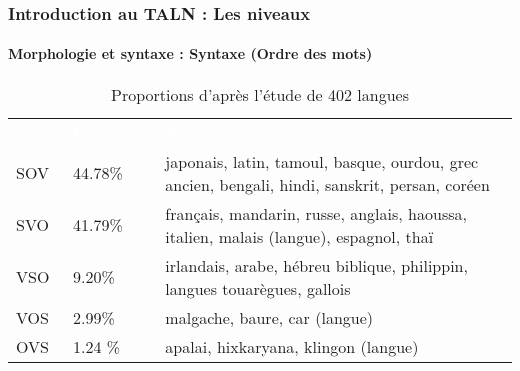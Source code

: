 \documentclass[xcolor=table]{beamer}
\begin{document}
\begin{frame}
\frametitle{Introduction au TALN : Les niveaux}
\framesubtitle{Morphologie et syntaxe : Syntaxe (Ordre des mots)}

\begin{table}
	\begin{tabular}{p{}p{}p{}}
		\rowcolor{darkblue}
		\textcolor{white}{Ordre} & \textcolor{white}{Proportion} & \textcolor{white}{Exemples} \\
		SOV & 44.78\% & japonais, latin, tamoul, basque, ourdou, grec ancien, bengali, hindi, sanskrit, persan, coréen \\
		SVO & 41.79\% & français, mandarin, russe, anglais, haoussa, italien, malais (langue), espagnol, thaï \\
		VSO & 9.20\% & irlandais, arabe, hébreu biblique, philippin, langues touarègues, gallois \\
		VOS & 2.99\% & malgache, baure, car (langue) \\
		OVS & 1.24 \% & apalai, hixkaryana, klingon (langue) \\
	\end{tabular}
	\caption{Proportions d'après l'étude de 402 langues \cite{1988-blake}}
\end{table}

\end{frame}
\end{document}
